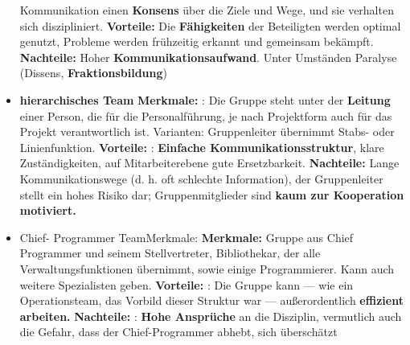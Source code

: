 \documentclass{book}
\begin{document}
\begin{itemize}
        Kommunikation einen\textbf{ Konsens} über die Ziele und Wege, und sie verhalten sich diszipliniert.
        \newline \textbf{Vorteile: }Die\textbf{ Fähigkeiten} der Beteiligten werden optimal genutzt, Probleme werden frühzeitig erkannt und
        gemeinsam bekämpft.
        \newline \textbf{Nachteile: } Hoher \textbf{Kommunikationsaufwand}. Unter Umständen Paralyse (Dissens, \textbf{Fraktionsbildung})
        \item \textbf{hierarchisches Team}
        \newline \textbf{Merkmale: }: Die Gruppe steht unter der\textbf{ Leitung }einer Person, die für die Personalführung, je nach
        Projektform auch für das Projekt verantwortlich ist.
        Varianten: Gruppenleiter übernimmt Stabs- oder Linienfunktion.
        \newline \textbf{Vorteile: }:\textbf{ Einfache Kommunikationsstruktur}, klare Zuständigkeiten, auf Mitarbeiterebene gute
        Ersetzbarkeit.
        \newline \textbf{Nachteile: } Lange Kommunikationswege (d. h. oft schlechte Information), der Gruppenleiter stellt ein hohes
        Risiko dar; Gruppenmitglieder sind \textbf{kaum zur Kooperation motiviert.}

        \item Chief- Programmer TeamMerkmale:
        \newline \textbf{Merkmale: } Gruppe aus Chief Programmer und seinem Stellvertreter, Bibliothekar, der alle Verwaltungsfunktionen übernimmt, sowie einige Programmierer.
        Kann auch weitere Spezialisten geben.
        \newline \textbf{Vorteile: }: Die Gruppe kann — wie ein Operationsteam, das Vorbild dieser Struktur war — außerordentlich
        \textbf{effizient arbeiten.}
        \newline \textbf{Nachteile: }: \textbf{Hohe Ansprüche }an die Disziplin, vermutlich auch die Gefahr, dass der Chief-Programmer
        abhebt, sich überschätzt
    \end{itemize}
\end{document}
